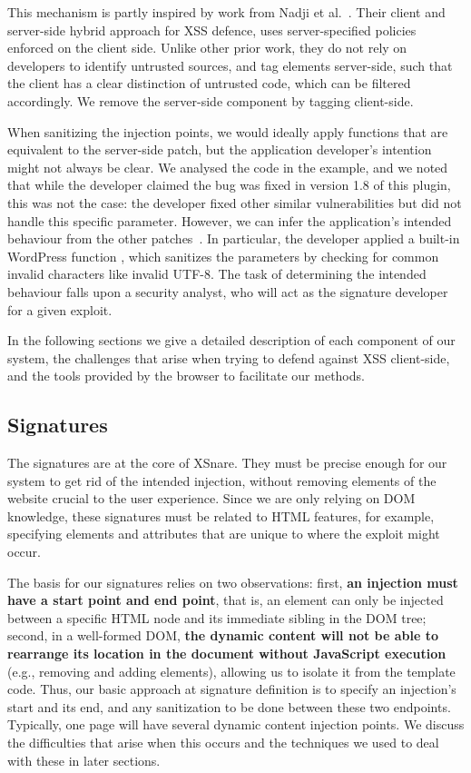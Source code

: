 This mechanism is partly inspired by work from Nadji et al.~\cite{Nadji:2009}. Their client and server-side hybrid approach for XSS defence, uses server-specified policies enforced on the client side. Unlike other prior work, they do not rely on developers to identify untrusted sources, and tag elements server-side, such that the client has a clear distinction of untrusted code, which can be filtered accordingly. We remove the server-side component by tagging client-side.

When sanitizing the injection points, we would ideally apply functions that are equivalent to the server-side patch, but the application developer's intention might not always be clear. We analysed the code in the example, and we noted that while the developer claimed the bug was fixed in version 1.8 of this plugin, this was not the case: the developer fixed other similar vulnerabilities but did not handle this specific parameter. However, we can infer the application's intended behaviour from the other patches~\cite{rccpatch}. In particular, the developer applied a built-in WordPress function , which sanitizes the parameters by checking for common invalid characters like invalid UTF-8. The task of determining the intended behaviour falls upon a security analyst, who will act as the signature developer for a given exploit.  

In the following sections we give a detailed description of each component of our system, the challenges that arise when trying to defend against XSS client-side, and the tools provided by the browser to facilitate our methods. 

\subsection{\sys Signatures} \label{signatures}
The signatures are at the core of XSnare. They must be precise enough for our system to get rid of the intended injection, without removing elements of the website crucial to the user experience. Since we are only relying on DOM knowledge, these signatures must be related to HTML features, for example, specifying elements and attributes that are unique to where the exploit might occur. 

The basis for our signatures relies on two observations: first, \textbf{an injection must have a start point and end point}, that is, an element can only be injected between a specific HTML node and its immediate sibling in the DOM tree; second, in a well-formed DOM, \textbf{the dynamic content will not be able to rearrange its location in the document without JavaScript execution} (e.g., removing and adding elements), allowing us to isolate it from the template code. Thus, our basic approach at signature definition is to specify an injection's start and its end, and any sanitization to be done between these two endpoints. Typically, one page will have several dynamic content injection points. We discuss the difficulties that arise when this occurs and the techniques we used to deal with these in later sections.

